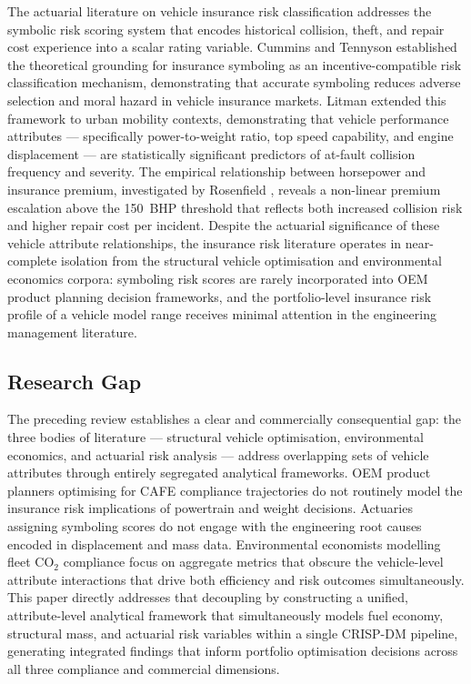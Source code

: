 \documentclass[conference]{IEEEtran}
\begin{document}
The actuarial literature on vehicle insurance risk classification
addresses the symbolic risk scoring system that encodes historical
collision, theft, and repair cost experience into a scalar rating variable.
Cummins and Tennyson \cite{cummins1992incentive} established the theoretical
grounding for insurance symboling as an incentive-compatible risk
classification mechanism, demonstrating that accurate symboling reduces
adverse selection and moral hazard in vehicle insurance markets.
Litman \cite{litman2011distance} extended this framework to urban mobility
contexts, demonstrating that vehicle performance attributes — specifically
power-to-weight ratio, top speed capability, and engine displacement —
are statistically significant predictors of at-fault collision frequency
and severity. The empirical relationship between horsepower and insurance
premium, investigated by Rosenfield \cite{rosenfield1994automobile}, reveals
a non-linear premium escalation above the 150~BHP threshold that reflects
both increased collision risk and higher repair cost per incident. Despite
the actuarial significance of these vehicle attribute relationships, the
insurance risk literature operates in near-complete isolation from the
structural vehicle optimisation and environmental economics corpora:
symboling risk scores are rarely incorporated into OEM product planning
decision frameworks, and the portfolio-level insurance risk profile of
a vehicle model range receives minimal attention in the engineering
management literature.

\subsection{Research Gap}

The preceding review establishes a clear and commercially consequential
gap: the three bodies of literature — structural vehicle optimisation,
environmental economics, and actuarial risk analysis — address overlapping
sets of vehicle attributes through entirely segregated analytical frameworks.
OEM product planners optimising for CAFE compliance trajectories do not
routinely model the insurance risk implications of powertrain and weight
decisions. Actuaries assigning symboling scores do not engage with the
engineering root causes encoded in displacement and mass data. Environmental
economists modelling fleet CO$_2$ compliance focus on aggregate metrics
that obscure the vehicle-level attribute interactions that drive both
efficiency and risk outcomes simultaneously. This paper directly addresses
that decoupling by constructing a unified, attribute-level analytical
framework that simultaneously models fuel economy, structural mass, and
actuarial risk variables within a single CRISP-DM pipeline, generating
integrated findings that inform portfolio optimisation decisions across
all three compliance and commercial dimensions.
\end{document}

